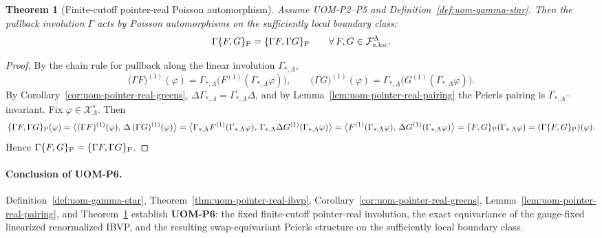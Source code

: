 \documentclass[10pt]{article}
\theoremstyle{definition}
\theoremstyle{plain}
\newtheorem{theorem}{Theorem}[section]
\begin{document}
\begin{theorem}[Finite-cutoff pointer-real Poisson automorphism]
\label{thm:uom-pointer-real-poisson}
Assume UOM-P2--P5 and Definition~\ref{def:uom-gamma-star}.  Then the pullback involution $\Gamma$ acts by Poisson automorphisms on the
sufficiently local boundary class:
\[
\Gamma\{F,G\}_{\rm P}
=
\{\Gamma F,\Gamma G\}_{\rm P}
\qquad
\forall\,F,G\in\mathcal F_{\rm s.loc}^\Lambda.
\]
\end{theorem}

\begin{proof}
By the chain rule for pullback along the linear involution $\Gamma_{*,\Lambda}$,
\[
\bigl(\Gamma F\bigr)^{(1)}(\varphi)
=
\Gamma_{*,\Lambda}\bigl(F^{(1)}(\Gamma_{*,\Lambda}\varphi)\bigr),
\qquad
\bigl(\Gamma G\bigr)^{(1)}(\varphi)
=
\Gamma_{*,\Lambda}\bigl(G^{(1)}(\Gamma_{*,\Lambda}\varphi)\bigr).
\]
By Corollary~\ref{cor:uom-pointer-real-greens},
\(
\Delta\Gamma_{*,\Lambda}=\Gamma_{*,\Lambda}\Delta
\),
and by Lemma~\ref{lem:uom-pointer-real-pairing} the Peierls pairing is $\Gamma_{*,\Lambda}$--invariant.
Fix \(\varphi\in\mathcal X_\Lambda^s\). Then
\[
\{\Gamma F,\Gamma G\}_{\rm P}(\varphi)
=
\big\langle (\Gamma F)^{(1)}(\varphi),\,\Delta\,(\Gamma G)^{(1)}(\varphi)\big\rangle
=
\big\langle \Gamma_{*,\Lambda}F^{(1)}(\Gamma_{*,\Lambda}\varphi),\,
\Gamma_{*,\Lambda}\Delta G^{(1)}(\Gamma_{*,\Lambda}\varphi)\big\rangle
=
\big\langle F^{(1)}(\Gamma_{*,\Lambda}\varphi),\,\Delta G^{(1)}(\Gamma_{*,\Lambda}\varphi)\big\rangle
=
\{F,G\}_{\rm P}(\Gamma_{*,\Lambda}\varphi)
=
(\Gamma\{F,G\}_{\rm P})(\varphi).
\]
Hence \(\Gamma\{F,G\}_{\rm P}=\{\Gamma F,\Gamma G\}_{\rm P}\).
\end{proof}

\paragraph{Conclusion of UOM-P6.}
Definition~\ref{def:uom-gamma-star}, Theorem~\ref{thm:uom-pointer-real-ibvp}, Corollary~\ref{cor:uom-pointer-real-greens},
Lemma~\ref{lem:uom-pointer-real-pairing}, and Theorem~\ref{thm:uom-pointer-real-poisson} establish \textbf{UOM-P6}: the fixed finite-cutoff
pointer-real involution, the exact equivariance of the gauge-fixed linearized renormalized IBVP, and the resulting swap-equivariant Peierls
structure on the sufficiently local boundary class.

\end{document}
